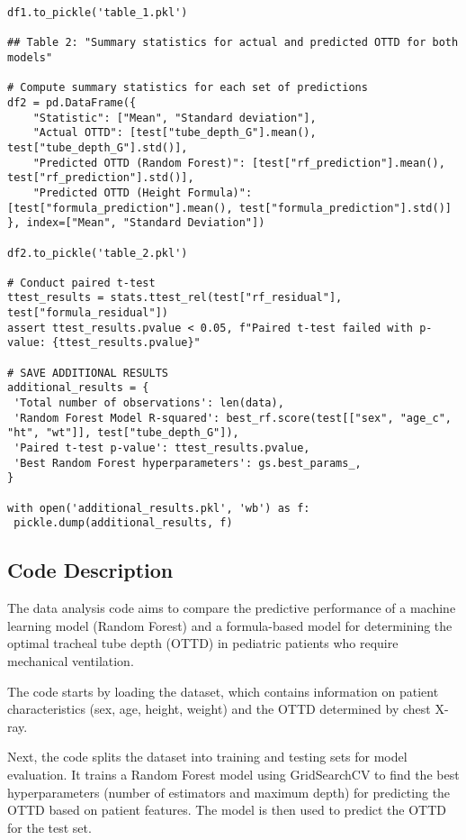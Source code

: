 \documentclass[11pt]{article}
\begin{document}
\begin{verbatim}
df1.to_pickle('table_1.pkl')

## Table 2: "Summary statistics for actual and predicted OTTD for both models"

# Compute summary statistics for each set of predictions
df2 = pd.DataFrame({
    "Statistic": ["Mean", "Standard deviation"],
    "Actual OTTD": [test["tube_depth_G"].mean(), test["tube_depth_G"].std()],
    "Predicted OTTD (Random Forest)": [test["rf_prediction"].mean(), test["rf_prediction"].std()],
    "Predicted OTTD (Height Formula)": [test["formula_prediction"].mean(), test["formula_prediction"].std()]
}, index=["Mean", "Standard Deviation"])

df2.to_pickle('table_2.pkl')

# Conduct paired t-test
ttest_results = stats.ttest_rel(test["rf_residual"], test["formula_residual"])
assert ttest_results.pvalue < 0.05, f"Paired t-test failed with p-value: {ttest_results.pvalue}"

# SAVE ADDITIONAL RESULTS
additional_results = {
 'Total number of observations': len(data), 
 'Random Forest Model R-squared': best_rf.score(test[["sex", "age_c", "ht", "wt"]], test["tube_depth_G"]),
 'Paired t-test p-value': ttest_results.pvalue,
 'Best Random Forest hyperparameters': gs.best_params_,
}

with open('additional_results.pkl', 'wb') as f:
 pickle.dump(additional_results, f)

\end{verbatim}

\subsection{Code Description}

The data analysis code aims to compare the predictive performance of a machine learning model (Random Forest) and a formula-based model for determining the optimal tracheal tube depth (OTTD) in pediatric patients who require mechanical ventilation.

The code starts by loading the dataset, which contains information on patient characteristics (sex, age, height, weight) and the OTTD determined by chest X-ray. 

Next, the code splits the dataset into training and testing sets for model evaluation. It trains a Random Forest model using GridSearchCV to find the best hyperparameters (number of estimators and maximum depth) for predicting the OTTD based on patient features. The model is then used to predict the OTTD for the test set.
\end{document}
